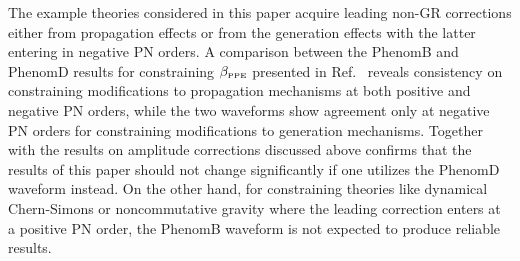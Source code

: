 \documentclass[prd,twocolumn,nofootinbib]{revtex4-1}
\newcommand{\PPE}{{\mbox{\tiny PPE}}}
\begin{document}
The example theories considered in this paper acquire leading non-GR corrections either from propagation effects or from the generation effects with the latter entering in negative PN orders. A comparison between the PhenomB and PhenomD results for constraining $\beta_{\PPE}$ presented in Ref.~\cite{Yunes:2016jcc} reveals consistency on constraining modifications to propagation mechanisms at both positive and negative PN orders, while the two waveforms show agreement only at negative PN orders for constraining modifications to generation mechanisms. Together with the results on amplitude corrections discussed above confirms that the results of this paper should not change significantly if one utilizes the PhenomD waveform instead. On the other hand, for constraining theories like dynamical Chern-Simons or noncommutative gravity where the leading correction enters at a positive PN order, the PhenomB waveform is not expected to produce reliable results.



\end{document}
